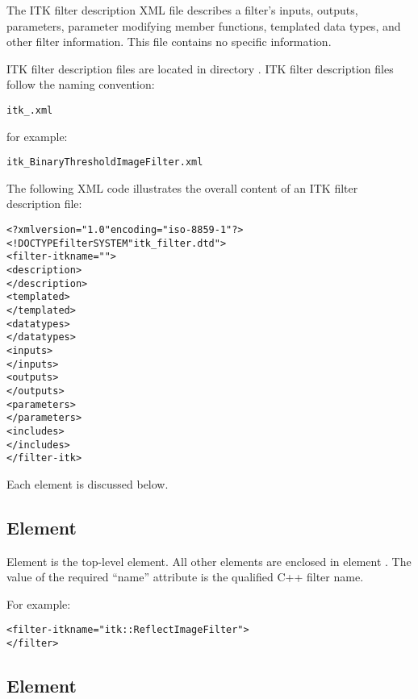 The ITK filter description XML file describes a filter's inputs,
outputs, parameters, parameter modifying member functions, templated
data types, and other filter information.  This file contains no \sr{}
specific information.  

ITK filter description files are located in
directory . 
ITK filter description files follow the naming convention:

\begin{alltt}
  itk\_.xml
\end{alltt}

for example:

\begin{alltt}
  itk\_BinaryThresholdImageFilter.xml
\end{alltt}


The following XML code illustrates the overall content of an ITK
filter description file:

\begin{alltt}
  <?xml version="1.0" encoding="iso-8859-1"?>
  <!DOCTYPE filter SYSTEM "itk_filter.dtd">
  <filter-itk name="">
     <description>
     \velide
     </description>
     <templated>
     \velide
     </templated>
     <datatypes>
     \velide
     </datatypes>
     <inputs>
     \velide
     </inputs>
     <outputs>
     \velide
     </outputs>
     <parameters>
     \velide
     </parameters>
     <includes>
     \velide   
     </includes>
  </filter-itk>
\end{alltt}

Each element is discussed below.

\subsection{Element }
\label{sec:itk_mods:filter-itk_element}

Element  is the top-level element.  All other
elements are enclosed in element . The value
of the required ``name'' attribute is the qualified C++ filter name.

For example:

\begin{alltt}
  <filter-itk name="itk::ReflectImageFilter">
    \velide
  </filter>
\end{alltt}

\subsection{Element }
\label{sec:itk_mods:descr_element}

